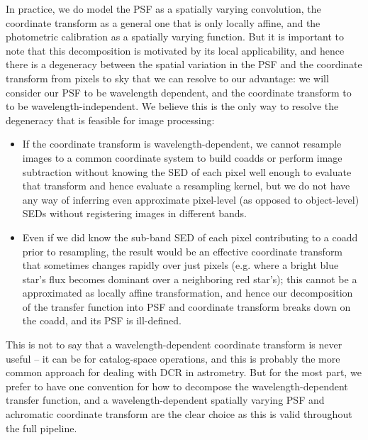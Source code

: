 \documentclass[DM,authoryear,toc]{lsstdoc}
\begin{document}
In practice, we do model the PSF as a spatially varying convolution, the coordinate transform as a general one that is only locally affine, and the photometric calibration as a spatially varying function.
But it is important to note that this decomposition is motivated by its local applicability, and hence there is a degeneracy between the spatial variation in the PSF and the coordinate transform from pixels to sky that we can resolve to our advantage: we will consider our PSF to be wavelength dependent, and the coordinate transform to to be wavelength-independent.
We believe this is the only way to resolve the degeneracy that is feasible for image processing:
\begin{itemize}
\item If the coordinate transform is wavelength-dependent, we cannot resample images to a common coordinate system to build coadds or perform image subtraction without knowing the SED of each pixel well enough to evaluate that transform and hence evaluate a resampling kernel, but we do not have any way of inferring even approximate pixel-level (as opposed to object-level) SEDs without registering images in different bands.
\item Even if we did know the sub-band SED of each pixel contributing to a coadd prior to resampling, the result would be an effective coordinate transform that sometimes changes rapidly over just pixels (e.g. where a bright blue star's flux becomes dominant over a neighboring red star's); this cannot be a approximated as locally affine transformation, and hence our decomposition of the transfer function into PSF and coordinate transform breaks down on the coadd, and its PSF is ill-defined.
\end{itemize}
This is not to say that a wavelength-dependent coordinate transform is never useful -- it can be for catalog-space operations, and this is probably the more common approach for dealing with DCR in astrometry.
But for the most part, we prefer to have one convention for how to decompose the wavelength-dependent transfer function, and a wavelength-dependent spatially varying PSF and achromatic coordinate transform are the clear choice as this is valid throughout the full pipeline.
\end{document}
